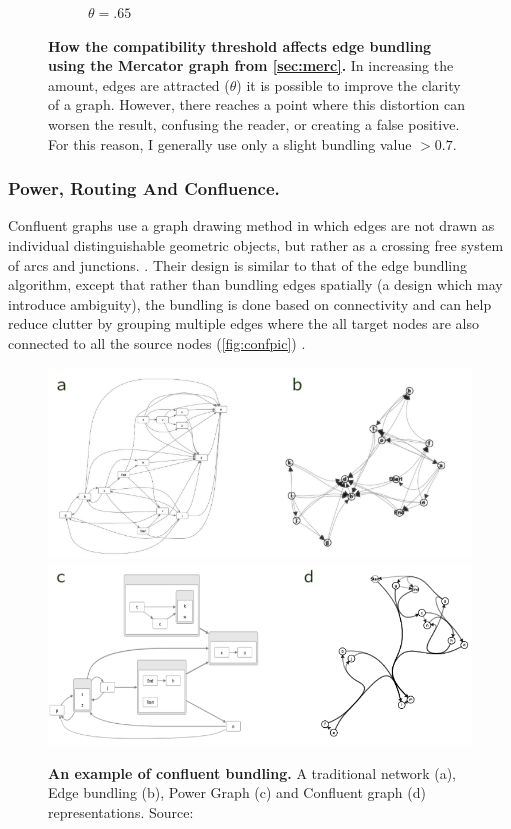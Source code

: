 \begin{figure}[H]
\begin{subfigure}[b]{.49\textwidth}
 \caption{$\theta = .65$}
 \end{subfigure}
        \caption{\textbf{How the compatibility threshold affects edge bundling using the Mercator graph from \autoref{sec:merc}.} In increasing the amount, edges are attracted ($\theta$) it is possible to improve the clarity of a graph. However, there reaches a point where this distortion can worsen the result, confusing the reader, or creating a false positive. For this reason, I generally use only a slight bundling value $> 0.7$.}
      \label{fig:edgebundling}
\end{figure}

\subsubsection{Power, Routing And Confluence.}

Confluent graphs use a graph drawing method in which edges are not drawn as individual distinguishable geometric objects, but rather as a crossing free system of arcs and junctions. \citep{confluient19}. Their design is similar to that of the edge bundling algorithm, except that rather than bundling edges spatially (a design which may introduce ambiguity), the bundling is done based on connectivity and can help reduce clutter by grouping multiple edges where the all target nodes are also connected to all the source nodes (\autoref{fig:confpic}) \citep{confpic}. 

\begin{figure}[H]
     \centering
     \includegraphics[width=.75\textwidth]{figures_c1/layout/confluent/example2.png}\\
     \includegraphics[width=.75\textwidth]{figures_c1/layout/confluent/example.png}\\
        \caption{\textbf{An example of confluent bundling. } A traditional network (a), Edge bundling (b), Power Graph (c) and Confluent graph (d) representations. Source: \citep{confpic}}
      \label{fig:confpic}
\end{figure}

